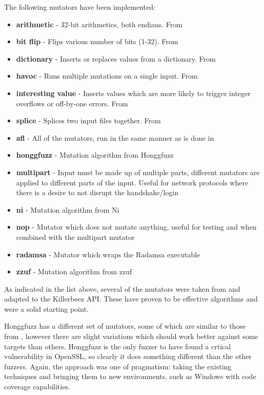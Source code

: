 The following mutators have been implemented:
\begin{itemize}[noitemsep]
\item \textbf{arithmetic} - 32-bit arithmetics, both endians. From \AFL{}
\item \textbf{bit flip} - Flips various number of bits (1-32). From \AFL{}
\item \textbf{dictionary} - Inserts or replaces values from a dictionary. From \AFL{}
\item \textbf{havoc} - Runs multiple mutations on a single input. From \AFL{}
\item \textbf{interesting value} - Inserts values which are more likely to trigger
                                   integer overflows or off-by-one errors. From
                                   \AFL{}
\item \textbf{splice} - Splices two input files together. From \AFL{}
\item \textbf{afl} - All of the \AFL{} mutators, run in the same manner as is
                     done in \AFL{}
\item \textbf{honggfuzz} - Mutation algorithm from Honggfuzz\cite{honggfuzz}
\item \textbf{multipart} - Input must be made up of multiple parts, different
                           mutators are applied to different parts of the
                           input. Useful for network protocols where there is
                           a desire to not disrupt the handshake/login
\item \textbf{ni} - Mutation algorithm from Ni\cite{ni}
\item \textbf{nop} - Mutator which does not mutate anything, useful for
                     testing and when combined with the multipart mutator
\item \textbf{radamsa} - Mutator which wraps the Radamsa\cite{radamsa} executable
\item \textbf{zzuf} - Mutation algorithm from zzuf\cite{zzuf}
\end{itemize}

As indicated in the list above, several of the mutators were taken from \AFL{}
and adapted to the Killerbeez API. These have proven to be effective algorithms
and were a solid starting point.

Honggfuzz has a different set of mutators, some of which are similar to those
from \AFL{}, however there are slight variations which should work better
against some targets than others.  Honggfuzz is the only fuzzer to have found a
crtical vulnerability in OpenSSL, so clearly it does
something different than the other fuzzers.  Again, the approach was one of pragmatism:
taking the existing techniques and bringing them to new
environments, such as Windows with code coverage capabilities.

